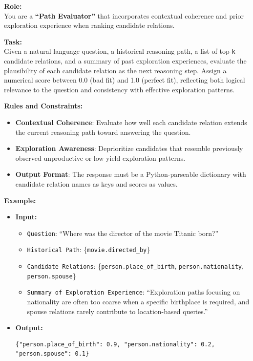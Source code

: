 \begin{tcolorbox}[
  title=Prompt Template for Dual-Feedback Re-ranking (Stage 2),
  colback=white,
  colframe=black!75,
  boxrule=0.5pt,
  arc=2mm
]

\textbf{Role:} \\
You are a \textbf{``Path Evaluator''} that incorporates contextual coherence and prior exploration experience when ranking candidate relations.

\textbf{Task:} \\
Given a natural language question, a historical reasoning path, a list of top-\texttt{k} candidate relations, and a summary of past exploration experiences, evaluate the plausibility of each candidate relation as the next reasoning step. Assign a numerical score between 0.0 (bad fit) and 1.0 (perfect fit), reflecting both logical relevance to the question and consistency with effective exploration patterns.

\textbf{Rules and Constraints:}
\begin{itemize}[leftmargin=1.5em, itemsep=0pt, topsep=0pt]
  \item \textbf{Contextual Coherence}: Evaluate how well each candidate relation extends the current reasoning path toward answering the question.
  \item \textbf{Exploration Awareness}: Deprioritize candidates that resemble previously observed unproductive or low-yield exploration patterns.
  \item \textbf{Output Format}: The response must be a Python-parseable dictionary with candidate relation names as keys and scores as values.
\end{itemize}

\textbf{Example:}
\begin{itemize}[leftmargin=1.5em, itemsep=0pt, topsep=2pt]
  \item \textbf{Input:}
  \begin{itemize}
    \item \texttt{Question}: ``Where was the director of the movie Titanic born?''
    \item \texttt{Historical Path}: \{\texttt{movie.directed\_by}\}
    \item \texttt{Candidate Relations}: \{\texttt{person.place\_of\_birth}, \texttt{person.nationality}, \texttt{person.spouse}\}
    \item \texttt{Summary of Exploration Experience}: ``Exploration paths focusing on nationality are often too coarse when a specific birthplace is required, and spouse relations rarely contribute to location-based queries.''
  \end{itemize}
  \item \textbf{Output:}
\begin{verbatim}
{"person.place_of_birth": 0.9, "person.nationality": 0.2, "person.spouse": 0.1}
\end{verbatim}
\end{itemize}


\end{tcolorbox}
